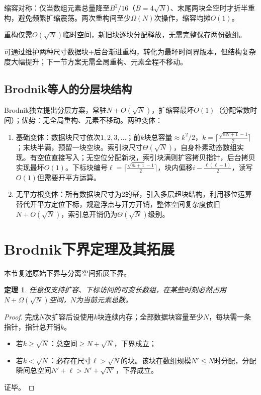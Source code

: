 \documentclass[11pt,a4paper]{article}
\newtheorem{thm}{定理}[section]
\begin{document}
缩容对称：仅当数组元素总量降至$B^2/16$（$B=4\sqrt{N}$）、末尾两块全空时才折半重构，避免频繁扩缩震荡。两次重构间至少$\Omega(N)$次操作，缩容均摊$O(1)$。

重构仅需$O(\sqrt{N})$临时空间，新旧块逐块分配释放，无需完整保存两份数组。

可通过维护两种尺寸数据块+后台渐进重构，转化为最坏时间界版本，但结构复杂度大幅提升；下一节方案无需全局重构、元素全程不移动。

\subsection{Brodnik等人的分层块结构}
Brodnik独立提出分层方案，常驻$N+O(\sqrt{N})$，扩缩容最坏$O(1)$（分配常数时间）；优势：无全局重构、元素不移动。两种变体：
\begin{enumerate}
    \item 基础变体：数据块尺寸依次$1,2,3,\dots$；前$k$块总容量$\approx k^2/2$，$k=\lceil\frac{\sqrt{8N+1}-1}{2}\rceil$；末块半满，预留一块空块。索引块尺寸$\Theta(\sqrt{N})$，自身朴素动态数组实现。有空位直接写入；无空位分配新块，索引块满则扩容拷贝指针，后台拷贝实现最坏$O(1)$。下标块编号$\ell=\lceil\frac{\sqrt{8i+1}-1}{2}\rceil$，块内偏移$i-\frac{\ell(\ell-1)}{2}$，读写$O(1)$但需要开平方运算。
    \item 无平方根变体：所有数据块尺寸为2的幂，引入多层超块结构，利用移位运算替代开平方定位下标，规避浮点与开方开销，整体空间复杂度依旧$N+O(\sqrt{N})$，索引总开销仍为$\Theta(\sqrt{N})$级别。
\end{enumerate}

\section{Brodnik下界定理及其拓展}
本节复述原始下界与分离空间拓展下界。
\begin{thm}
任意仅支持扩容、下标访问的可变长数组，在某些时刻必然占用$N+\Omega(\sqrt{N})$空间，$N$为当前元素总数。
\end{thm}
\begin{proof}
完成$N$次扩容后设使用$k$块连续内存；全部数据块容量至少$N$，每块需一条指针，指针总开销$k$。
\begin{itemize}
    \item 若$k\ge\sqrt{N}$：总空间$\ge N+\sqrt{N}$，下界成立；
    \item 若$k<\sqrt{N}$：必存在尺寸$\ell>\sqrt{N}$的块。该块在数组规模$N'\le N$时分配，分配瞬间总空间$N'+\ell>N'+\sqrt{N'}$，下界成立。
\end{itemize}
证毕。
\end{proof}
\end{document}
